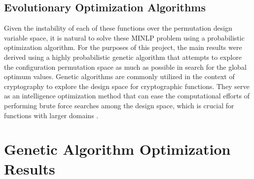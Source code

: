 \documentclass[11pt]{article}
\begin{document}
\subsection{Evolutionary Optimization Algorithms}

Given the instability of each of these functions over the permutation design variable space, it is natural to solve these MINLP problem using a probabilistic optimization algorithm. For the purposes of this project, the main results were derived using a highly probabilistic genetic algorithm that attempts to explore the configuration permutation space as much as possible in search for the global optimum values. Genetic algorithms are commonly utilized in the context of cryptography to explore the design space for cryptographic functions. They serve as an intelligence optimization method that can ease the computational efforts of performing brute force searches among the design space, which is crucial for functions with larger domains \cite{Skein}.

\section{Genetic Algorithm Optimization Results}
\end{document}
